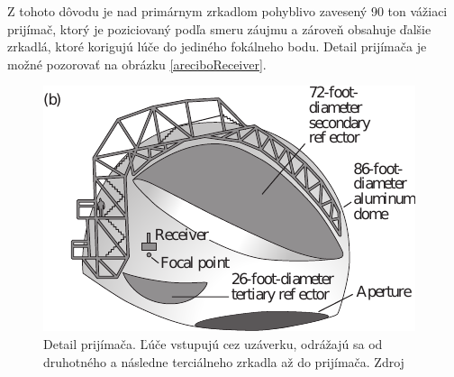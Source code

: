 Z tohoto dôvodu je nad primárnym zrkadlom pohyblivo zavesený 90 ton vážiaci prijímač, ktorý je poziciovaný
podľa smeru záujmu a zároveň obsahuje ďalšie zrkadlá, ktoré korigujú lúče do jediného fokálneho
bodu\cite{hechtoptics}. Detail prijímača je možné pozorovať na obrázku \ref{areciboReceiver}.

\begin{figure}
\includegraphics[scale=0.9]{obrazky-figures/areciboReceiver.pdf}
    \centering \caption{Detail prijímača. Ľúče vstupujú cez uzáverku, odrážajú sa od druhotného a
    následne terciálneho zrkadla až do prijímača. Zdroj\cite{hechtoptics}}
\end{figure}

